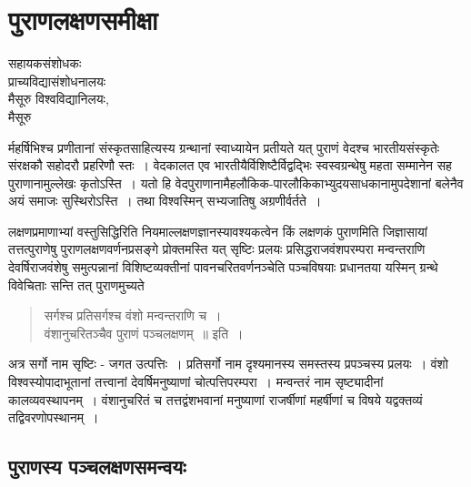 \chapter{पुराणलक्षणसमीक्षा}

\begin{center}
\smallskip

सहायकसंशोधकः\\ 
प्राच्यविद्यासंशोधनालयः\\ 
मैसूरु विश्वविद्यानिलयः,\\ 
मैसूरु
\end{center}

र्महर्षिभिश्च प्रणीतानां संस्कृतसाहित्यस्य ग्रन्थानां स्वाध्यायेन प्रतीयते यत् पुराणं वेदश्च भारतीयसंस्कृतेः संरक्षकौ सहोदरौ प्रहरिणौ स्तः~। वेदकालत एव भारतीयैर्विशिष्टैर्विद्वद्भिः स्वस्वग्रन्थेषु महता सम्मानेन सह पुराणानामुल्लेखः कृतोऽस्ति~। यतो हि वेदपुराणानामैहलौकिक-पारलौकिकाभ्युदयसाधकानामुपदेशानां बलेनैव अयं समाजः सुस्थिरोऽस्ति~। तथा विश्वस्मिन् सभ्यजातिषु अग्रणीर्वर्तते~।

लक्षणप्रमाणाभ्यां वस्तुसिद्धिरिति नियमाल्लक्षणज्ञानस्यावश्यकत्वेन किं लक्षणकं पुराणमिति जिज्ञासायां तत्तत्पुराणेषु पुराणलक्षणवर्णनप्रसङ्गे प्रोक्तमस्ति यत् सृष्टिः प्रलयः प्रसिद्धराजवंशपरम्परा मन्वन्तराणि देवर्षिराजवंशेषु समुत्पन्नानां विशिष्टव्यक्तीनां पावनचरितवर्णनञ्चेति पञ्चविषयाः प्रधानतया यस्मिन् ग्रन्थे विवेचिताः सन्ति तत् पुराणमुच्यते
\begin{verse}
सर्गश्च प्रतिसर्गश्च वंशो मन्वन्तराणि च~।\\
वंशानुचरितञ्चैव पुराणं पञ्चलक्षणम्~॥ इति~।
\end{verse}
अत्र सर्गो नाम सृष्टिः - जगत उत्पत्तिः~। प्रतिसर्गो नाम दृश्यमानस्य समस्तस्य प्रपञ्चस्य प्रलयः~। वंशो विश्वस्योपादाभूतानां तत्त्वानां देवर्षिमनुष्याणां चोत्पत्तिपरम्परा~। मन्वन्तरं नाम सृष्ट्यादीनां कालव्यवस्थापनम्~। वंशानुचरितं च तत्तद्वंशभवानां मनुष्याणां राजर्षीणां महर्षीणां च विषये यद्वक्तव्यं तद्विवरणोपस्थानम्~।

\section*{पुराणस्य पञ्चलक्षणसमन्वयः}

